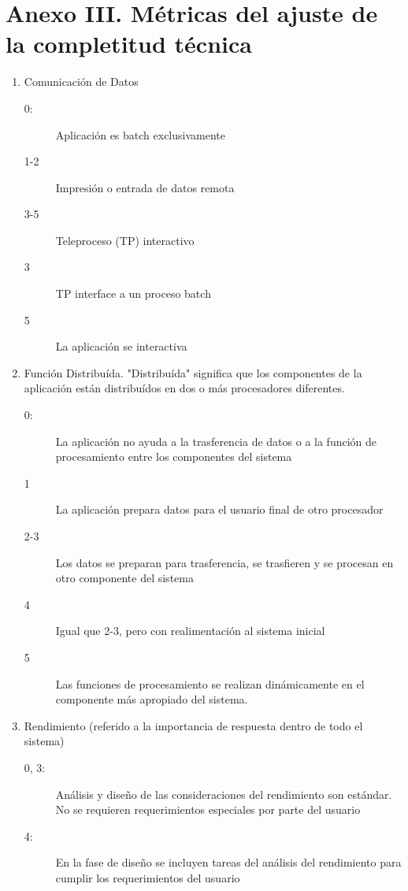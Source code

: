     \section{Anexo III. Métricas del ajuste de la completitud técnica}
        \begin{enumerate}
            \item Comunicación de Datos
                \begin{description}
                    \item[0:] Aplicación es batch exclusivamente
                    \item[1-2] Impresión o entrada de datos remota
                    \item[3-5] Teleproceso (TP) interactivo
                    \item[3] TP interface a un proceso batch
                    \item[5] La aplicación se interactiva
                \end{description}
            \item Función Distribuída. "Distribuída" significa que los componentes de la aplicación están distribuídos en dos o más procesadores diferentes.
                \begin{description}
                    \item[0:] La aplicación no ayuda a la trasferencia de datos o a la función de procesamiento entre los componentes del sistema
                    \item[1] La aplicación prepara datos para el usuario final de otro procesador
                    \item[2-3] Los datos se preparan para trasferencia, se trasfieren y se procesan en otro componente del sistema
                    \item[4] Igual que 2-3, pero con realimentación al sistema inicial
                    \item[5] Las funciones de procesamiento se realizan dinámicamente en el componente más apropiado del sistema.
                \end{description}
            \item Rendimiento (referido a la importancia de respuesta dentro de todo el sistema)
                \begin{description}
                    \item[0, 3:]Análisis y diseño de las consideraciones del rendimiento son estándar. No se requieren requerimientos especiales por parte del usuario
                    \item[4:]En la fase de diseño se incluyen tareas del análisis del rendimiento para cumplir los requerimientos del usuario

\end{description}
\end{enumerate}
